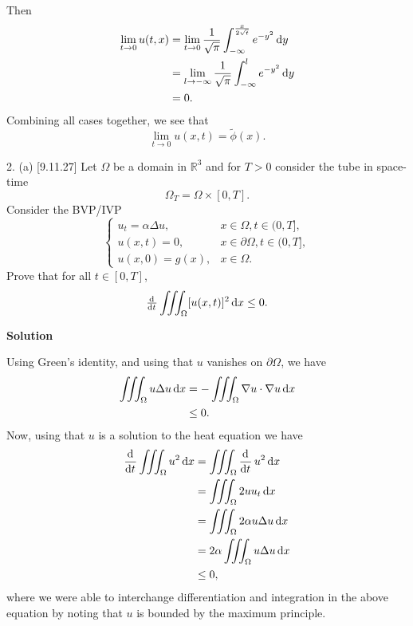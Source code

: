 \documentclass{article}
\begin{document}
Then
%
\begin{align*}
    \lim_{t \to 0} u(t, x)
        &= \lim_{t \to 0} \frac{1}{\sqrt{\pi}} \int_{-\infty}^{\frac{x}{2\sqrt{t}}} e^{-y^2} \dif y \\
        &= \lim_{l \to -\infty} \frac{1}{\sqrt{\pi}} \int_{-\infty}^{l} e^{-y^2} \dif y \\
        &= 0
        .
\end{align*}
%
Combining all cases together, we see that
%
\begin{equation*}
    \lim_{t \to 0} u(x, t) = \widetilde{\phi}(x)
    .
\end{equation*}

\newpage

2. (a) [9.11.27] Let $\Omega$ be a domain in $\mathbb{R}^3$ and for
$T > 0$ consider the tube in space-time
%
\begin{equation*}
    \Omega_T = \Omega \times [0, T]
    .
\end{equation*}
%
Consider the BVP/IVP
%
\begin{equation*}
    \begin{cases}
        u_t = \alpha \Delta u, & x \in \Omega, t \in (0, T], \\
        u(x, t) = 0, & x \in \partial \Omega, t \in (0, T], \\
        u(x, 0) = g(x), & x \in \Omega.
    \end{cases}
\end{equation*}
%
Prove that for all $t \in [0, T]$,
%
\begin{equation*}
    \od{}{t} \iiint_\Omega [u(x, t)]^2 \dif x \leq 0
    .
\end{equation*}

\textbf{Solution}

Using Green's identity, and using that $u$ vanishes on $\partial
\Omega$, we have
%
\begin{align*}
    \iiint_\Omega u \Delta u \dif x
        &= - \iiint_\Omega \nabla u \cdot \nabla u \dif x \\
        &\leq 0
        .
\end{align*}
%
Now, using that $u$ is a solution to the heat equation we have
%
\begin{align*}
    \dod{}{t} \iiint_\Omega u^2 \dif x
        &= \iiint_\Omega \dod{}{t} u^2 \dif x \\
        &= \iiint_\Omega 2 u u_t \dif x \\
        &= \iiint_\Omega 2 \alpha  u \Delta u \dif x \\
        &= 2 \alpha \iiint_\Omega u \Delta u \dif x \\
        &\leq 0
        ,
\end{align*}
%
where we were able to interchange differentiation and integration in the
above equation by noting that $u$ is bounded by the maximum principle.
\end{document}
